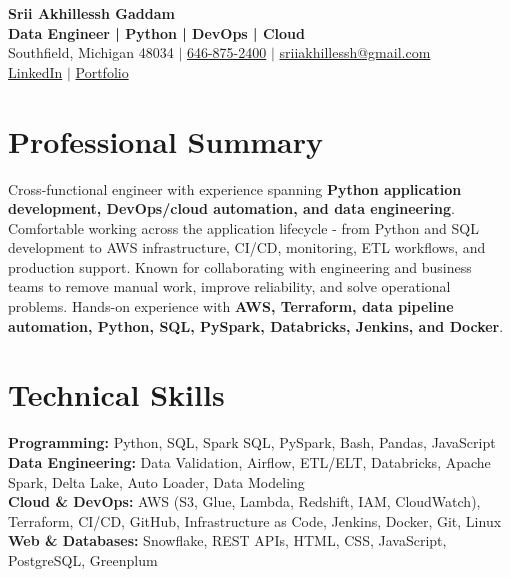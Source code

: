 \documentclass[letterpaper,10pt]{article}
\begin{document}
\fontsize{9.35pt}{10.45pt}\selectfont

\begin{center}
    {\LARGE \textbf{Srii Akhillessh Gaddam}} \\[-1pt]
    \textbf{Data Engineer | Python | DevOps | Cloud} \\[2pt]
    Southfield, Michigan 48034 $|$
    \href{tel:6468752400}{646-875-2400} $|$
    \href{mailto:sriiakhillessh@gmail.com}{sriiakhillessh@gmail.com} \\[1pt]
    \href{https://www.linkedin.com/in/srii-akhiilessh-gaddam-b48668191/}{LinkedIn} $|$
    \href{https://sriiakhillesshg.github.io/portfolio/}{Portfolio}
\end{center}
\vspace{-8pt}

\section{Professional Summary}
\small{Cross-functional engineer with experience spanning \textbf{Python application development, DevOps/cloud automation, and data engineering}. Comfortable working across the application lifecycle - from Python and SQL development to AWS infrastructure, CI/CD, monitoring, ETL workflows, and production support. Known for collaborating with engineering and business teams to remove manual work, improve reliability, and solve operational problems. Hands-on experience with \textbf{AWS, Terraform, data pipeline automation, Python, SQL, PySpark, Databricks, Jenkins, and Docker}.}

\section{Technical Skills}
\small{
\textbf{Programming:} Python, SQL, Spark SQL, PySpark, Bash, Pandas, JavaScript \\
\textbf{Data Engineering:} Data Validation, Airflow, ETL/ELT, Databricks, Apache Spark, Delta Lake, Auto Loader, Data Modeling \\
\textbf{Cloud \& DevOps:} AWS (S3, Glue, Lambda, Redshift, IAM, CloudWatch), Terraform, CI/CD, GitHub, Infrastructure as Code, Jenkins, Docker, Git, Linux \\
\textbf{Web \& Databases:} Snowflake, REST APIs, HTML, CSS, JavaScript, PostgreSQL, Greenplum
}
\end{document}
